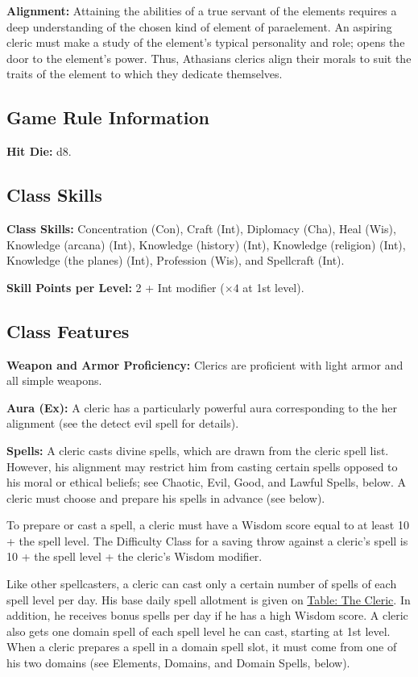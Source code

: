 \textbf{Alignment:} Attaining the abilities of a true servant of the elements requires a deep understanding of the chosen kind of element of paraelement. An aspiring cleric must make a study of the element's typical personality and role; opens the door to the element's power. Thus, Athasians clerics align their morals to suit the traits of the element to which they dedicate themselves.

\subsection{Game Rule Information}

\textbf{Hit Die:} d8.

\subsection{Class Skills}

\textbf{Class Skills:} Concentration (Con), Craft (Int), Diplomacy (Cha), Heal (Wis), Knowledge (arcana) (Int), Knowledge (history) (Int), Knowledge (religion) (Int), Knowledge (the planes) (Int), Profession (Wis), and Spellcraft (Int).

\textbf{Skill Points per Level:} 2 + Int modifier ($\times4$ at 1st level).

\subsection{Class Features}

\textbf{Weapon and Armor Proficiency:} Clerics are proficient with light armor and all simple weapons.

\textbf{Aura (Ex):} A cleric has a particularly powerful aura corresponding to the her alignment (see the detect evil spell for details).

\textbf{Spells:} A cleric casts divine spells, which are drawn from the cleric spell list. However, his alignment may restrict him from casting certain spells opposed to his moral or ethical beliefs; see Chaotic, Evil, Good, and Lawful Spells, below. A cleric must choose and prepare his spells in advance (see below).

To prepare or cast a spell, a cleric must have a Wisdom score equal to at least 10 + the spell level. The Difficulty Class for a saving throw against a cleric's spell is 10 + the spell level + the cleric's Wisdom modifier.

Like other spellcasters, a cleric can cast only a certain number of spells of each spell level per day. His base daily spell allotment is given on \hyperref[tab:The Cleric]{Table: The Cleric}. In addition, he receives bonus spells per day if he has a high Wisdom score. A cleric also gets one domain spell of each spell level he can cast, starting at 1st level. When a cleric prepares a spell in a domain spell slot, it must come from one of his two domains (see Elements, Domains, and Domain Spells, below).

